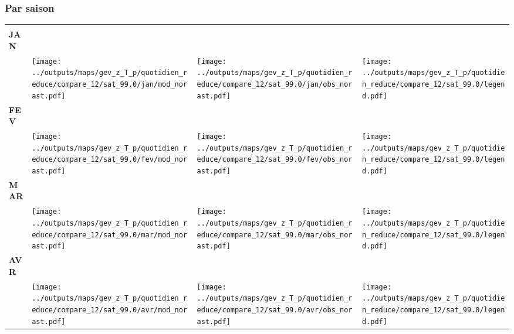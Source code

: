 \documentclass[
  letterpaper,
  DIV=11,
  numbers=noendperiod]{scrartcl}
\begin{document}
\subsubsection{Par saison}\label{par-saison-3}

\begin{longtable*}{m{2.0cm}m{7.9cm}m{7.9cm}m{1cm}}
 & \centering  & \centering  & \tabularnewline
\centering \textbf{JAN} \\[0.2em] \begin{tabular}{r@{\hspace{0.2em}}l}\end{tabular} & \centering \texttt{[image: ../outputs/maps/gev\_z\_T\_p/quotidien\_reduce/compare\_12/sat\_99.0/jan/mod\_norast.pdf]} & \centering \texttt{[image: ../outputs/maps/gev\_z\_T\_p/quotidien\_reduce/compare\_12/sat\_99.0/jan/obs\_norast.pdf]} & \centering \texttt{[image: ../outputs/maps/gev\_z\_T\_p/quotidien\_reduce/compare\_12/sat\_99.0/legend.pdf]} \tabularnewline
\centering \textbf{FEV} \\[0.2em] \begin{tabular}{r@{\hspace{0.2em}}l}\end{tabular} & \centering \texttt{[image: ../outputs/maps/gev\_z\_T\_p/quotidien\_reduce/compare\_12/sat\_99.0/fev/mod\_norast.pdf]} & \centering \texttt{[image: ../outputs/maps/gev\_z\_T\_p/quotidien\_reduce/compare\_12/sat\_99.0/fev/obs\_norast.pdf]} & \centering \texttt{[image: ../outputs/maps/gev\_z\_T\_p/quotidien\_reduce/compare\_12/sat\_99.0/legend.pdf]} \tabularnewline
\centering \textbf{MAR} \\[0.2em] \begin{tabular}{r@{\hspace{0.2em}}l}\end{tabular} & \centering \texttt{[image: ../outputs/maps/gev\_z\_T\_p/quotidien\_reduce/compare\_12/sat\_99.0/mar/mod\_norast.pdf]} & \centering \texttt{[image: ../outputs/maps/gev\_z\_T\_p/quotidien\_reduce/compare\_12/sat\_99.0/mar/obs\_norast.pdf]} & \centering \texttt{[image: ../outputs/maps/gev\_z\_T\_p/quotidien\_reduce/compare\_12/sat\_99.0/legend.pdf]} \tabularnewline
\centering \textbf{AVR} \\[0.2em] \begin{tabular}{r@{\hspace{0.2em}}l}\end{tabular} & \centering \texttt{[image: ../outputs/maps/gev\_z\_T\_p/quotidien\_reduce/compare\_12/sat\_99.0/avr/mod\_norast.pdf]} & \centering \texttt{[image: ../outputs/maps/gev\_z\_T\_p/quotidien\_reduce/compare\_12/sat\_99.0/avr/obs\_norast.pdf]} & \centering \texttt{[image: ../outputs/maps/gev\_z\_T\_p/quotidien\_reduce/compare\_12/sat\_99.0/legend.pdf]} \tabularnewline

\end{longtable*}
\end{document}
